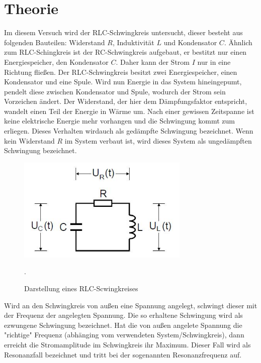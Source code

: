 \section{Theorie}
Im diesem Versuch wird der RLC-Schwingkreis untersucht, dieser besteht aus folgenden
Bauteilen: Widerstand $R$, Induktivität $L$ und Kondensator $C$.
Ähnlich zum RLC-Schingkreis ist der RC-Schwingkreis aufgebaut, er bestitzt nur einen
Energiespeicher, den Kondensator $C$. Daher kann der Strom $I$ nur in eine Richtung fließen.
Der RLC-Schwingkreis besitzt zwei Energiespeicher, einen Kondensator und eine
Spule. Wird nun Energie in das System hineingepumt, pendelt diese zwischen Kondensator und
Spule, wodurch der Strom sein Vorzeichen ändert. Der Widerstand, der hier dem
Dämpfungsfaktor entspricht, wandelt einen Teil der Energie in Wärme um. Nach einer
gewissen Zeitspanne ist keine elektrische Energie mehr vorhangen und die Schwingung
kommt zum erliegen. Dieses Verhalten wirdauch als gedämpfte Schwingung bezeichnet.
Wenn kein Widerstand $R$ im System verbaut ist, wird dieses System als
ungedämpften Schwingung bezeichnet.
\begin{figure}[H]
  \centering
  \includegraphics[height=5cm]{RLC.JPG}
  \caption{Darstellung eines RLC-Scwingkreises}
  \cite{skript}.
  \label{fig:RLC}
\end{figure}
Wird an den Schwingkreis von außen eine Spannung angelegt, schwingt dieser
mit der Frequenz der angelegten Spannung. Die so erhaltene Schwingung wird als
ezwungene Schwingung bezeichnet. Hat die von außen angelete Spannung die "richtige"
Frequenz (abhänging vom verwendeten System/Schwingkreis), dann erreicht die Stromamplitude im
Schwingkreis ihr Maximum. Dieser Fall wird als Resonanzfall bezeichnet und tritt bei der
sogenannten Resonanzfrequenz auf.

